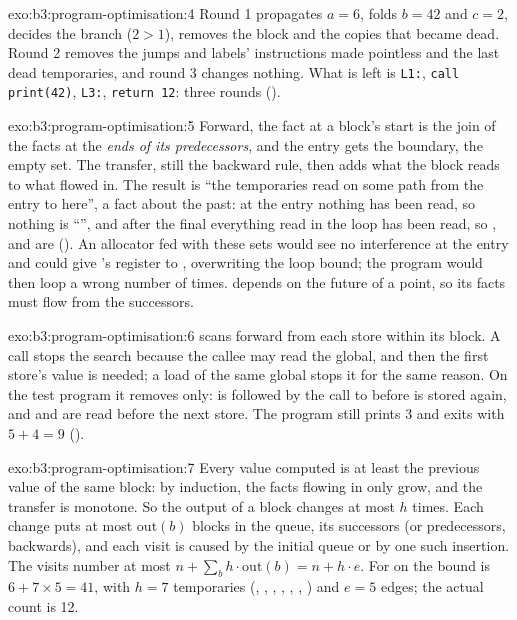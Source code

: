 \begin{solution}{exo:b3:program-optimisation:4}
Round 1 propagates $a = 6$, folds $b = 42$ and $c = 2$, decides the branch ($2 > 1$), removes the  block and the copies that became dead. Round 2 removes the jumps and labels' instructions made pointless and the last dead temporaries, and round 3 changes nothing. What is left is \texttt{L1:}, \texttt{call print(42)}, \texttt{L3:}, \texttt{return 12}: three rounds ().
\end{solution}

\begin{solution}{exo:b3:program-optimisation:5}
Forward, the fact at a block's start is the join of the facts at the \emph{ends of its predecessors}, and the entry gets the boundary, the empty set. The transfer, still the backward rule, then adds what the block reads to what flowed in. The result is ``the temporaries read on some path from the entry to here'', a fact about the past: at the entry nothing has been read, so nothing is ``'', and after the final  everything read in the loop has been read, so ,  and  are (). An allocator fed with these sets would see no interference at the entry and could give 's register to , overwriting the loop bound; the program would then loop a wrong number of times.  depends on the future of a point, so its facts must flow from the successors.
\end{solution}

\begin{solution}{exo:b3:program-optimisation:6}
 scans forward from each store within its block. A call stops the search because the callee may read the global, and then the first store's value is needed; a load of the same global stops it for the same reason. On the test program it removes  only:  is followed by the call to  before  is stored again, and  and  are read before the next store. The program still prints 3 and exits with $5 + 4 = 9$ ().
\end{solution}

\begin{solution}{exo:b3:program-optimisation:7}
Every value computed is at least the previous value of the same block: by induction, the facts flowing in only grow, and the transfer is monotone. So the output of a block changes at most $h$ times. Each change puts at most $\mathrm{out}(b)$ blocks in the queue, its successors (or predecessors, backwards), and each visit is caused by the initial queue or by one such insertion. The visits number at most $n + \sum_b h \cdot \mathrm{out}(b) = n + h \cdot e$. For  on  the bound is $6 + 7 \times 5 = 41$, with $h = 7$ temporaries (, , , , , , ) and $e = 5$ edges; the actual count is 12.
\end{solution}

